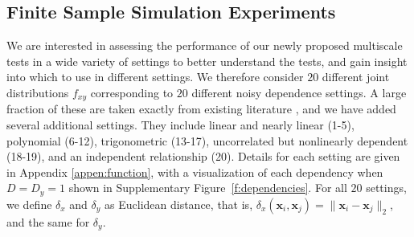 \documentclass[11pt]{article}
\providecommand{\mb}[1]{\boldsymbol{#1}}
\begin{document}
\subsection*{Finite Sample Simulation Experiments}


We are interested in assessing the performance of our newly proposed multiscale tests in a wide variety of settings to better understand the tests, and gain insight into which to use in different settings.  
We therefore consider $20$ different joint distributions $f_{xy}$ corresponding to $20$ different noisy dependence settings. A large fraction of these are taken exactly from existing literature \cite{SzekelyRizzoBakirov2007, SimonTibshirani2012, GorfineHellerHeller2012, HellerGorfine2013}, and we have added several additional settings.  They include
linear and nearly linear  (1-5),
polynomial   (6-12),
trigonometric (13-17),
uncorrelated but nonlinearly dependent  (18-19),
and an independent relationship (20).
Details for each setting are given in Appendix \ref{appen:function}, with a visualization of each dependency when $D=D_y=1$ shown in Supplementary Figure~\ref{f:dependencies}. For all $20$ settings, we define  $\delta_x$ and $\delta_y$  as  Euclidean distance, that is, $\delta_x(\mb{x}_i,\mb{x}_j) = \|\mb{x}_i - \mb{x}_j\|_{2}$, and the same for $\delta_y$.
\end{document}
